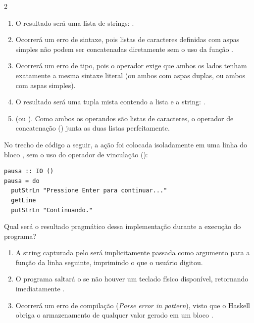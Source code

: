 \documentclass[a4paper,10pt,brazil]{article}
\begin{document}
\begin{multicols}{2}
\begin{enumerate}
  \item O resultado será uma lista de strings: \haskellinline{["Ha", "skell"]}.

  \item Ocorrerá um erro de sintaxe, pois listas de caracteres definidas com aspas simples não podem ser concatenadas diretamente sem o uso da função .

  \item Ocorrerá um erro de tipo, pois o operador \haskellinline{++} exige que ambos os lados tenham exatamente a mesma sintaxe literal (ou ambos com aspas duplas, ou ambos com aspas simples).

  \item O resultado será uma tupla mista contendo a lista e a string: .

  \item {} (ou \haskellinline{['H', 'a', 's', 'k', 'e', 'l', 'l']}). Como ambos os operandos são listas de caracteres, o operador de concatenação (\haskellinline{++}) junta as duas listas perfeitamente.


\end{enumerate}

No trecho de código a seguir, a ação  foi colocada isoladamente em uma linha do bloco , sem o uso do operador de vinculação (\haskellinline{<-}):

\begin{verbatim}
pausa :: IO ()
pausa = do
  putStrLn "Pressione Enter para continuar..."
  getLine
  putStrLn "Continuando."
\end{verbatim}

Qual será o resultado pragmático dessa implementação durante a execução do programa?

\begin{enumerate}
  \item A string capturada pelo  será implicitamente passada como argumento para a função  da linha seguinte, imprimindo o que o usuário digitou.

  \item O programa saltará o  se não houver um teclado físico disponível, retornando imediatamente .

  \item Ocorrerá um erro de compilação (\emph{Parse error in pattern}), visto que o Haskell obriga o armazenamento de qualquer valor gerado em um bloco .


\end{enumerate}
\end{multicols}
\end{document}
